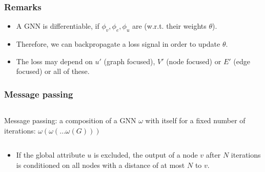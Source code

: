 \documentclass{beamer}
\begin{document}
\begin{frame}
\frametitle{Remarks}
\begin{itemize}
\item A GNN is differentiable, if $\phi_v, \phi_e, \phi_u$ are (w.r.t. their weights $\theta$). \pause
\item Therefore, we can backpropagate a loss signal in order to update $\theta$. \pause
\item The loss may depend on $u'$ (graph focused), $V'$ (node focused) or $E'$ (edge focused) or all of these. 
\end{itemize}
\end{frame}

\begin{frame}
\frametitle{Message passing}
\begin{columns}[t]
\begin{column}{.4\textwidth}
Message passing: a composition of a GNN $\omega$ with itself for a fixed number of iterations: $\omega(\omega(\dots\omega(G)))$
\end{column}
\begin{column}{.6\textwidth}
\centering {} 
\end{column}
\end{columns} \pause
\begin{itemize}
\item If the global attribute $u$ is excluded, the output of a node $v$ after $N$ iterations is conditioned on all nodes with a distance of at most $N$ to $v$. 
\end{itemize}
\end{frame}
\end{document}
